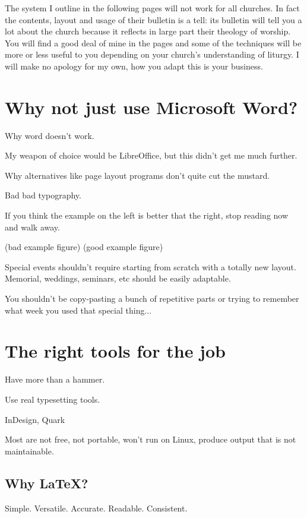 \documentclass[12pt]{scrartcl}
\begin{document}
The system I outline in the following pages will not work for all churches. In fact the contents, layout and usage of their bulletin is a tell: its bulletin will tell you a lot about the church because it reflects in large part their theology of worship. You will find a good deal of mine in the pages and some of the techniques will be more or less useful to you depending on your church's understanding of liturgy. I will make no apology for my own, how you adapt this is your business.

\tableofcontents

\section{Why not just use Microsoft Word?}

Why word doesn't work.

My weapon of choice would be LibreOffice, but this didn't get me much further.

Why alternatives like page layout programs don't quite cut the mustard.

Bad bad typography.

If you think the example on the left is better that the right, stop reading now and walk away.

(bad example figure) (good example figure)

Special events shouldn't require starting from scratch with a totally new layout. Memorial, weddings, seminars, etc should be easily adaptable.

You shouldn't be copy-pasting a bunch of repetitive parts or trying to remember what week you used that special thing...

\section{The right tools for the job}

Have more than a hammer.

Use real typesetting tools.

InDesign, Quark

Most are not free, not portable, won't run on Linux, produce output that is not maintainable.

\subsection{Why \LaTeX?}

Simple. Versatile. Accurate. Readable. Consistent.
\end{document}

